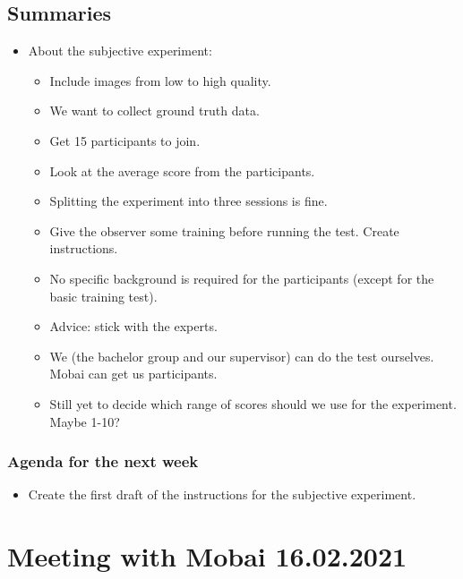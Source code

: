 \subsection*{Summaries}
\begin{itemize}
\item About the subjective experiment:
    \begin{itemize}
    \item Include images from low to high quality.
    \item We want to collect ground truth data.
    \item Get 15 participants to join.
    \item Look at the average score from the participants.
    \item Splitting the experiment into three sessions is fine.
    \item Give the observer some training before running the test. Create instructions.
    \item No specific background is required for the participants (except for the basic training test). 
    \item Advice: stick with the experts.
    \item We (the bachelor group and our supervisor) can do the test ourselves.
    Mobai can get us participants. 
    \item Still yet to decide which range of scores should we use for the experiment. Maybe 1-10? 
    \end{itemize}
\end{itemize}

\subsubsection*{Agenda for the next week}
\begin{itemize}
    \item Create the first draft of the instructions for the subjective experiment.
\end{itemize}

\newpage

\section*{Meeting with Mobai 16.02.2021}

